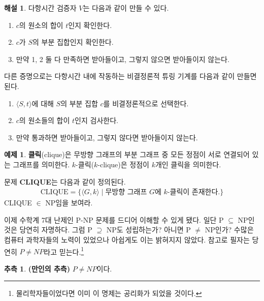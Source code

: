 \documentclass[b5paper, 11pt]{book}
\theoremstyle{definition}
\newtheorem{ex}[defn]{예제}
\newtheorem{conj}[defn]{추측}
\newtheorem*{ans*}{해설}
\begin{document}
\begin{ans*}
    다항시간 검증자 $V$는 다음과 같이 만들 수 있다.
    \begin{enumerate}
        \item $c$의 원소의 합이 $t$인지 확인한다.
        \item $c$가 $S$의 부분 집합인지 확인한다.
        \item 만약 1, 2 둘 다 만족하면 받아들이고, 그렇지 않으면 받아들이지 않는다.
    \end{enumerate}
    다른 증명으로는 다항시간 내에 작동하는 비결정론적 튜링 기계를 다음과 같이 만들면 된다.
    \begin{enumerate}
        \item $\langle S, t \rangle$에 대해 $S$의 부분 집합 $c$를 비결정론적으로 선택한다.
        \item $c$의 원소들의 합이 $t$인지 검사한다.
        \item 만약 통과하면 받아들이고, 그렇지 않다면 받아들이지 않는다. 
    \end{enumerate}
\end{ans*}
\begin{ex}
    \textbf{클릭}(clique)은 무방향 그래프의 부분 그래프 중 모든 정점이 서로 연결되어 있는 그래프를 의미한다. $k$-클릭($k$-clique)은 정점이 $k$개인 클릭을 의미한다.
\begin{figure}[!ht]
    \centering
    \caption{}
\end{figure}
문제 \textbf{CLIQUE}는 다음과 같이 정의된다.
\begin{align*}
    \text{CLIQUE} = \{ \langle G , k \rangle \;\vert\; \text{무방향 그래프 } 
    G\text{에 }k\text{-클릭이 존재한다.}\}
\end{align*}
CLIQUE $\in$ NP임을 보여라.
\end{ex}
이제 수학계 7대 난제인 P-NP 문제를 드디어 이해할 수 있게 됐다. 일단 P $\subseteq$ NP인 것은 당연히 자명하다. 그럼 P $\supseteq$ NP도 성립하는가? 아니면 P $\neq$ NP인가? 수많은 컴퓨터 과학자들의 노력이 있었으나 아쉽게도 이는 밝혀지지 않았다. 참고로 필자는 당연히 $P \neq NP$라고 믿는다.\footnote{물리학자들이었다면 이미 이 명제는 공리화가 되었을 것이다.}
\begin{conj}
    \textbf{(만인의 추측)} $P \neq NP$이다.
\end{conj} 
\end{document}
